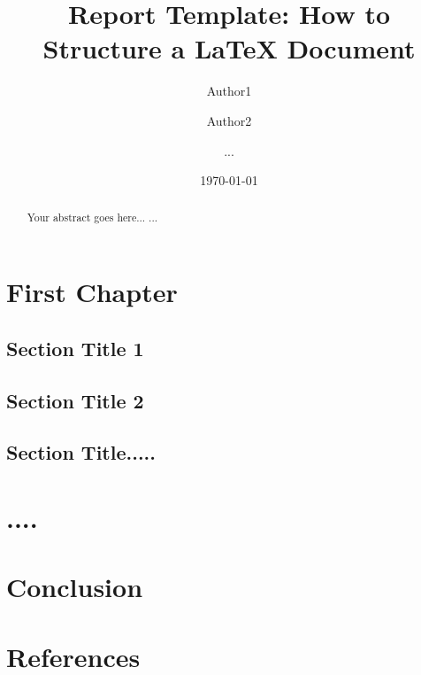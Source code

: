 \documentclass[11pt,a4paper]{report}
\begin{document}
\title{Report Template: How to Structure a LaTeX Document}
\author{Author1 \and Author2 \and ...}
\date{\today}
\maketitle

\begin{abstract}
Your abstract goes here...
...
\end{abstract}

\chapter{First Chapter}

\section{Section Title 1}
\section{Section Title 2}
\section{Section Title.....}

\chapter{....}

\chapter{Conclusion}
\chapter*{References}
\end{document}
